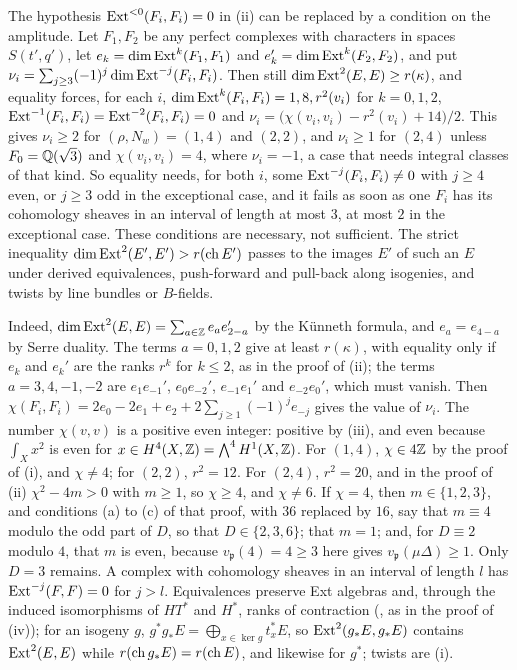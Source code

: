 \begin{remark}\label{rem:quarticnegext}
The hypothesis $\operatorname{Ext}^{<0}(F_{i},F_{i})=0$ in
(ii) can be replaced by a condition on the
amplitude. Let $F_{1},F_{2}$ be any perfect complexes with characters in
spaces $S(t',q')$, let $e_{k}=\dim\operatorname{Ext}^{k}(F_{1},F_{1})$ and
$e_{k}'=\dim\operatorname{Ext}^{k}(F_{2},F_{2})$, and put
$\nu_{i}=\sum_{j\ge3}(-1)^{j}\dim\operatorname{Ext}^{-j}(F_{i},F_{i})$. Then still
$\dim\operatorname{Ext}^{2}(E,E)\ge r(\kappa)$, and equality forces, for each $i$,
$\dim\operatorname{Ext}^{k}(F_{i},F_{i})=1,8,r^{2}(v_{i})$ for $k=0,1,2$,
$\operatorname{Ext}^{-1}(F_{i},F_{i})=\operatorname{Ext}^{-2}(F_{i},F_{i})=0$ and
$\nu_{i}=\bigl(\chi(v_{i},v_{i})-r^{2}(v_{i})+14\bigr)/2$. This gives
$\nu_{i}\ge2$ for $(\rho,N_{w})=(1,4)$ and $(2,2)$, and $\nu_{i}\ge1$ for
$(2,4)$ unless $F_{0}=\mathbb{Q}(\sqrt3)$ and $\chi(v_{i},v_{i})=4$, where
$\nu_{i}=-1$, a case that needs integral classes of that kind. So
equality needs, for both $i$, some $\operatorname{Ext}^{-j}(F_{i},F_{i})\ne0$ with $j\ge4$
even, or $j\ge3$ odd in the exceptional case, and it fails as soon as one
$F_{i}$ has its cohomology sheaves in an interval of length at most $3$, at
most $2$ in the exceptional case. These conditions are necessary, not
sufficient. The strict inequality $\dim\operatorname{Ext}^{2}(E',E')>r(\operatorname{ch} E')$ passes to
the images $E'$ of such an $E$ under derived equivalences, push-forward and
pull-back along isogenies, and twists by line bundles or $B$-fields.

Indeed, $\dim\operatorname{Ext}^{2}(E,E)=\sum_{a\in\mathbb{Z}}e_{a}e_{2-a}'$ by the K\"unneth
formula, and $e_{a}=e_{4-a}$ by Serre duality. The terms $a=0,1,2$ give at
least $r(\kappa)$, with equality only if $e_{k}$ and $e_{k}'$ are the ranks
$r^{k}$ for $k\le2$, as in the proof of (ii); the
terms $a=3,4,-1,-2$ are $e_{1}e_{-1}'$, $e_{0}e_{-2}'$, $e_{-1}e_{1}'$ and
$e_{-2}e_{0}'$, which must vanish. Then
$\chi(F_{i},F_{i})=2e_{0}-2e_{1}+e_{2}+2\sum_{j\ge1}(-1)^{j}e_{-j}$ gives the
value of $\nu_{i}$. The number $\chi(v,v)$ is a positive even integer:
positive by (iii), and even because $\int_{X}x^{2}$ is
even for $x\in H^{4}(X,\mathbb{Z})=\bigwedge^{4}H^{1}(X,\mathbb{Z})$. For $(1,4)$,
$\chi\in4\mathbb{Z}$ by the proof of (i), and $\chi\ne4$; for
$(2,2)$, $r^{2}=12$. For $(2,4)$, $r^{2}=20$, and in the proof of
(ii) $\chi^{2}-4m>0$ with $m\ge1$, so $\chi\ge4$, and
$\chi\ne6$. If $\chi=4$, then $m\in\{1,2,3\}$, and conditions (a) to (c) of
that proof, with $36$ replaced by $16$, say that $m\equiv4$ modulo the odd
part of $D$, so that $D\in\{2,3,6\}$; that $m=1$; and, for $D\equiv2$ modulo
$4$, that $m$ is even, because $v_{\mathfrak p}(4)=4\ge3$ here gives
$v_{\mathfrak p}(\mu\Delta)\ge1$. Only $D=3$ remains. A complex with cohomology
sheaves in an interval of length $l$ has $\operatorname{Ext}^{-j}(F,F)=0$ for $j>l$.
Equivalences preserve Ext algebras and, through the induced isomorphisms of
$HT^{*}$ and $H^{*}$, ranks of contraction (\cite{CRV12}, as in the proof of
(iv)); for an isogeny $g$,
$g^{*}g_{*}E=\bigoplus_{x\in\ker g}t_{x}^{*}E$, so $\operatorname{Ext}^{2}(g_{*}E,g_{*}E)$
contains $\operatorname{Ext}^{2}(E,E)$ while $r(\operatorname{ch} g_{*}E)=r(\operatorname{ch} E)$, and likewise for
$g^{*}$; twists are (i).
\end{remark}

